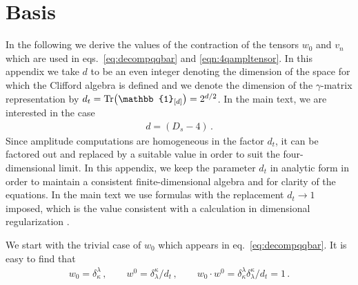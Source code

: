 \section{Basis}
\label{sec:identities}

In the following we derive the values of the contraction of the
tensors $w_0$ and $v_n$ which are used in 
eqs.~\eqref{eq:decompqqbar} and \eqref{eqn:4qampltensor}.
%
In this appendix we take $d$ to be an even integer denoting the
dimension of the space for which the Clifford algebra is defined
and we denote the dimension of the $\gamma$-matrix
representation by
$d_t=\Tr(\mathbb{1}_{[d]})=2^{d/2}$.
In the main text, we are interested in the case
%
\begin{eqnarray}
  d = (D_s-4)\,.
\end{eqnarray}
%
Since amplitude computations are homogeneous in the
factor $d_t$, it can be factored out and replaced by 
a suitable value in order to suit the four-dimensional 
limit. In this appendix, we keep the parameter $d_t$ in analytic
form in order to maintain a consistent finite-dimensional
algebra and for clarity of the equations. 
In the main text we use formulas with the replacement
$d_t\rightarrow 1$ imposed, which is the value consistent with a
calculation in dimensional regularization \cite{Collins:1984xc}.

We start with the trivial case of $w_0$ which appears in 
eq.~\eqref{eq:decompqqbar}. It is easy to find that
%
\begin{eqnarray}
  w_0=\delta_\kappa^\lambda\,,\qquad 
  w^0=\delta^\kappa_\lambda/d_t\,,\qquad 
  w_0\cdot w^0=\delta_\kappa^\lambda  \delta^\kappa_\lambda/d_t=1\,.
\end{eqnarray}

